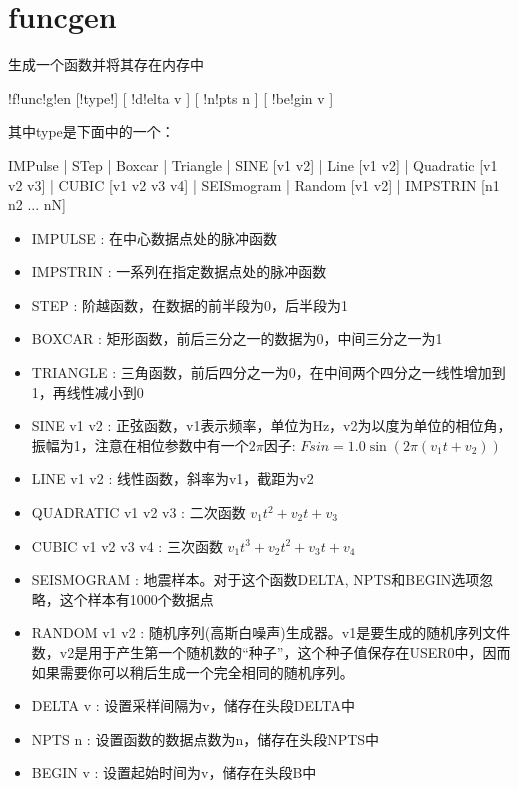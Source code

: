 \section{funcgen}
\label{cmd:funcgen}

生成一个函数并将其存在内存中

\begin{SACSyntax}
!f!unc!g!en [!type!] [ !d!elta v ] [ !n!pts n ] [ !be!gin v ]
\end{SACSyntax}

其中type是下面中的一个：

IMPulse | STep | Boxcar | Triangle | SINE [v1 v2] | Line [v1 v2] |
Quadratic [v1 v2 v3] | CUBIC [v1 v2 v3 v4] | SEISmogram | Random [v1 v2]
| IMPSTRIN  [n1 n2 ... nN]

\begin{itemize}
\item IMPULSE : 在中心数据点处的脉冲函数 
\item IMPSTRIN : 一系列在指定数据点处的脉冲函数  
\item STEP :  阶越函数，在数据的前半段为0，后半段为1 
\item BOXCAR : 矩形函数，前后三分之一的数据为0，中间三分之一为1 
\item TRIANGLE : 三角函数，前后四分之一为0，在中间两个四分之一线性增加到1，再线性减小到0 
\item SINE v1 v2 : 正弦函数，v1表示频率，单位为Hz，v2为以度为单位的相位角，振幅为1，注意在相位参数中有一个$2\pi$因子: $ Fsin = 1.0 \sin (2\pi (v_1t+v_2))$ 
\item LINE v1 v2 : 线性函数，斜率为v1，截距为v2 
\item QUADRATIC v1 v2 v3 : 二次函数 $v_1 t^{2} + v_2 t + v_3 $
\item CUBIC v1 v2 v3 v4 : 三次函数 $ v_1 t^{3} + v_2 t^2 + v_3t + v_4 $
\item SEISMOGRAM : 地震样本。对于这个函数DELTA, NPTS和BEGIN选项忽略，这个样本有1000个数据点 
\item RANDOM v1 v2 :  随机序列(高斯白噪声)生成器。v1是要生成的随机序列文件数，v2是用于产生第一个随机数的``种子''，这个种子值保存在USER0中，因而如果需要你可以稍后生成一个完全相同的随机序列。 
\item DELTA v : 设置采样间隔为v，储存在头段DELTA中 
\item NPTS n : 设置函数的数据点数为n，储存在头段NPTS中 
\item BEGIN v : 设置起始时间为v，储存在头段B中 
\end{itemize}

